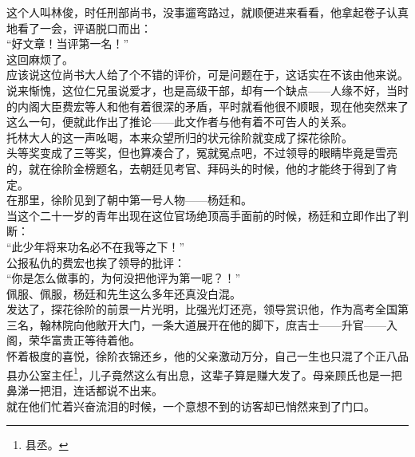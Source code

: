 \begin{multicols}{\theparacolNo}
这个人叫林俊，时任刑部尚书，没事遛弯路过，就顺便进来看看，他拿起卷子认真地看了一会，评语脱口而出：\\

“好文章！当评第一名！”\\

这回麻烦了。\\

应该说这位尚书大人给了个不错的评价，可是问题在于，这话实在不该由他来说。\\

说来惭愧，这位仁兄虽说爱才，也是高级干部，却有一个缺点——人缘不好，当时的内阁大臣费宏等人和他有着很深的矛盾，平时就看他很不顺眼，现在他突然来了这么一句，便就此作出了推论——此文作者与他有着不可告人的关系。\\

托林大人的这一声吆喝，本来众望所归的状元徐阶就变成了探花徐阶。\\

头等奖变成了三等奖，但也算凑合了，冤就冤点吧，不过领导的眼睛毕竟是雪亮的，就在徐阶金榜题名，去朝廷见考官、拜码头的时候，他的才能终于得到了肯定。\\

在那里，徐阶见到了朝中第一号人物——杨廷和。\\

当这个二十一岁的青年出现在这位官场绝顶高手面前的时候，杨廷和立即作出了判断：\\

“此少年将来功名必不在我等之下！”\\

公报私仇的费宏也挨了领导的批评：\\

“你是怎么做事的，为何没把他评为第一呢？！”\\

佩服、佩服，杨廷和先生这么多年还真没白混。\\

发达了，探花徐阶的前景一片光明，比强光灯还亮，领导赏识他，作为高考全国第三名，翰林院向他敞开大门，一条大道展开在他的脚下，庶吉士——升官——入阁，荣华富贵正等待着他。\\

怀着极度的喜悦，徐阶衣锦还乡，他的父亲激动万分，自己一生也只混了个正八品县办公室主任\footnote{县丞。}，儿子竟然这么有出息，这辈子算是赚大发了。母亲顾氏也是一把鼻涕一把泪，连话都说不出来。\\

就在他们忙着兴奋流泪的时候，一个意想不到的访客却已悄然来到了门口。\\


\end{multicols}
